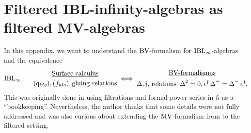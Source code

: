 \documentclass[\MainFolder/Text.tex]{subfiles}
\begin{document}
\chapter{Filtered IBL-infinity-algebras as filtered MV-algebras}\label{App:IBLMV}
In this appendix, we want to understand the $\mathrm{BV}$-formalism for $\mathrm{IBL}_\infty$-algebras and the equivalence
\[\mathrm{IBL}_\infty:\quad \begin{gathered}
\underline{\text{Surface calculus}} \\
(\mathfrak{q}_{klg}), (f_{klg}), \text{gluing relations}
\end{gathered}
\;\Longleftrightarrow\;
\begin{gathered}
\underline{\mathrm{BV}\text{-formalismus}} \\
 \operatorname{\Delta}, \mathfrak{f},\text{\,relations }\operatorname{\Delta}^2 = 0, e^{\mathfrak{f}} \operatorname{\Delta}^+ = \operatorname{\Delta}^- e^{\mathfrak{f}}.
\end{gathered}\]
%
This was originally done in \cite{Cieliebak2015} using filtrations and formal power series in $\hbar$ as a ``bookkeeping''. Nevertheless, the author thinks that some details were not fully addressed and was also curious about extending the $\mathrm{MV}$-formalism from \cite{Markl2015} to the filtered setting.
\end{document}
